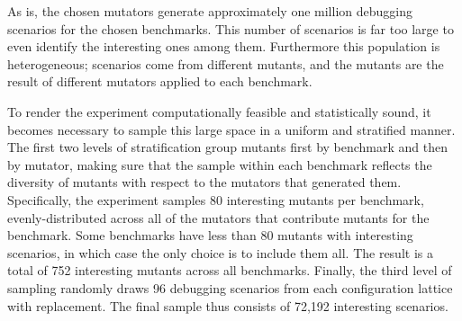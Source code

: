 

As is, the chosen mutators generate approximately one million debugging
scenarios for the chosen benchmarks. This number of scenarios is far too large
to even identify the interesting ones among them.  Furthermore this population
is heterogeneous; scenarios come from different mutants, and the mutants are the
result of different mutators applied to each benchmark.

To render the experiment computationally feasible and statistically sound, it
becomes necessary to sample this large space in a uniform and stratified manner.
The first two levels of stratification group mutants first by benchmark and then
by mutator, making sure that the sample within each benchmark reflects the
diversity of mutants with respect to the mutators that generated them.
Specifically, the experiment samples 80 interesting mutants per benchmark,
evenly-distributed across all of the mutators that contribute mutants for the
benchmark. Some benchmarks have less than 80 mutants with interesting scenarios,
in which case the only choice is to include them all.  The result is a total of
752 interesting mutants across all benchmarks.  Finally, the third level of
sampling randomly draws 96 debugging scenarios from each configuration lattice
with replacement. The final sample thus consists of 72,192 interesting
scenarios.



